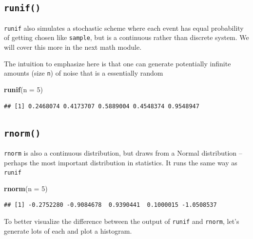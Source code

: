 \documentclass[]{book}
\newenvironment{Shaded}{\begin{snugshade}}{\end{snugshade}}
\newcommand{\KeywordTok}[1]{\textcolor[rgb]{0.13,0.29,0.53}{\textbf{#1}}}
\newcommand{\DataTypeTok}[1]{\textcolor[rgb]{0.13,0.29,0.53}{#1}}
\newcommand{\DecValTok}[1]{\textcolor[rgb]{0.00,0.00,0.81}{#1}}
\newcommand{\NormalTok}[1]{#1}
\theoremstyle{definition}
\theoremstyle{definition}
\theoremstyle{definition}
\theoremstyle{remark}
\begin{document}
\subsection*{\texorpdfstring{\texttt{runif()}}{runif()}}\label{runif}

\texttt{runif} also simulates a stochastic scheme where each event has
equal probability of getting chosen like \texttt{sample}, but is a
continuous rather than discrete system. We will cover this more in the
next math module.

The intuition to emphasize here is that one can generate potentially
infinite amounts (size \texttt{n}) of noise that is a essentially random

\begin{Shaded}
\begin{Highlighting}[]
\KeywordTok{runif}\NormalTok{(}\DataTypeTok{n =} \DecValTok{5}\NormalTok{)}
\end{Highlighting}
\end{Shaded}

\begin{verbatim}
## [1] 0.2468074 0.4173707 0.5889004 0.4548374 0.9548947
\end{verbatim}

\subsection*{\texorpdfstring{\texttt{rnorm()}}{rnorm()}}\label{rnorm}

\texttt{rnorm} is also a continuous distribution, but draws from a
Normal distribution -- perhaps the most important distribution in
statistics. It runs the same way as \texttt{runif}

\begin{Shaded}
\begin{Highlighting}[]
\KeywordTok{rnorm}\NormalTok{(}\DataTypeTok{n =} \DecValTok{5}\NormalTok{)}
\end{Highlighting}
\end{Shaded}

\begin{verbatim}
## [1] -0.2752280 -0.9084678  0.9390441  0.1000015 -1.0508537
\end{verbatim}

To better visualize the difference between the output of \texttt{runif}
and \texttt{rnorm}, let's generate lots of each and plot a histogram.
\end{document}
